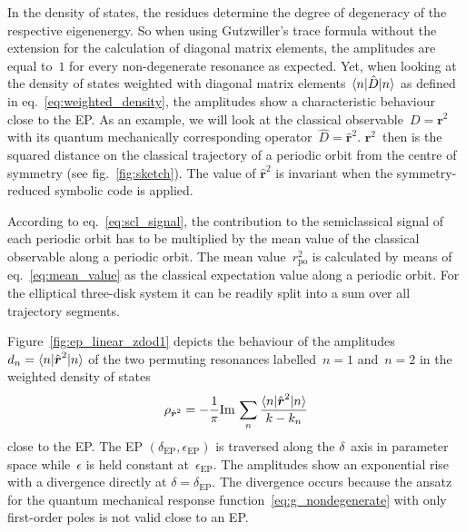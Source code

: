 \documentclass[doublecol]{epl2}
\renewcommand{\vec}[1]{\boldsymbol{#1}}
\renewcommand{\Im}{\mathrm{Im}\,}
\begin{document}
In the density of states, the residues determine the degree of degeneracy of the respective eigenenergy. So when using Gutzwiller's trace formula without the extension for the calculation of diagonal matrix elements, the amplitudes are equal to~$1$ for every non-degenerate resonance as expected. Yet, when looking at the density of states weighted with diagonal matrix elements~$\braket{n|\hat{D}|n}$ as defined in eq.~\eqref{eq:weighted_density}, the amplitudes show a characteristic behaviour close to the EP. As an example, we will look at the classical observable~$D = \vec{r}^2$ with its quantum mechanically corresponding operator~$\hat{D} = \hat{\vec{r}}^2$. $\vec{r}^2$~then is the squared distance on the classical trajectory of a periodic orbit from the centre of symmetry (see fig.~\ref{fig:sketch}). The value of $\hat{\vec{r}}^2$ is invariant when the symmetry-reduced symbolic code is applied.

According to eq.~\eqref{eq:scl_signal}, the contribution to the semiclassical signal of each periodic orbit has to be multiplied by the mean value of the classical observable along a periodic orbit. The mean value~$r^2_\mathrm{po}$ is calculated by means of eq.~\eqref{eq:mean_value} as the classical expectation value along a periodic orbit. For the elliptical three-disk system it can be readily split into a sum over all trajectory segments.

Figure~\ref{fig:ep_linear_zdod1} depicts the behaviour of the amplitudes~$d_n = \braket{n | \hat{\vec{r}}^2 | n}$ of the two permuting resonances labelled~$n=1$ and~$n=2$ in the weighted density of states
\begin{equation}
  \rho_{\hat{\vec{r}}^2}  = -\frac{1}{\pi} \Im \sum_n \frac{\braket{n | \hat{\vec{r}}^2 | n}}{k-k_n}
\end{equation}
close to the EP. The EP $(\delta_\mathrm{EP}, \epsilon_\mathrm{EP})$ is traversed along the $\delta$~axis in parameter space while~$\epsilon$ is held constant at~$\epsilon_\mathrm{EP}$. The amplitudes show an exponential rise with a divergence directly at $\delta = \delta_\mathrm{EP}$. The divergence occurs because the ansatz for the quantum mechanical response function~\eqref{eq:g_nondegenerate} with only first-order poles is not valid close to an EP.
\end{document}
